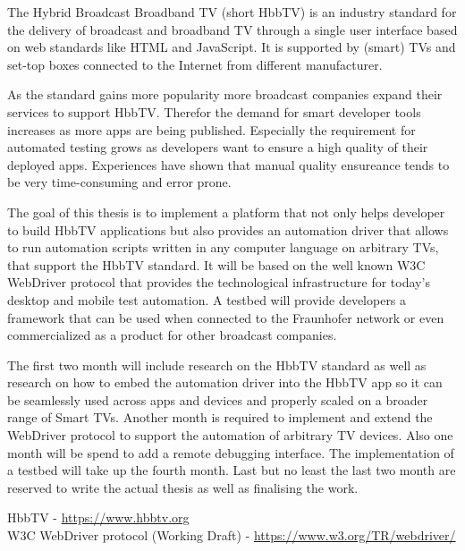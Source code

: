 
The Hybrid Broadcast Broadband TV (short HbbTV) is an industry standard for the delivery of broadcast and broadband TV
through a single user interface based on web standards like HTML and JavaScript. It is supported by (smart) TVs and
set-top boxes connected to the Internet from different manufacturer.


As the standard gains more popularity more broadcast companies expand their services to support HbbTV. Therefor the
demand for smart developer tools increases as more apps are being published. Especially the requirement for
automated testing grows as developers want to ensure a high quality of their deployed apps. Experiences have shown
that manual quality ensureance tends to be very time-consuming and error prone.


The goal of this thesis is to implement a platform that not only helps developer to build HbbTV applications but
also provides an automation driver that allows to run automation scripts written in any computer language on
arbitrary TVs, that support the HbbTV standard. It will be based on the well known W3C WebDriver protocol that
provides the technological infrastructure for today's desktop and mobile test automation. A testbed will provide
developers a framework that can be used when connected to the Fraunhofer network or even commercialized as
a product for other broadcast companies.


The first two month will include research on the HbbTV standard as well as research on how to embed the automation driver
into the HbbTV app so it can be seamlessly used across apps and devices and properly scaled on a broader range of
Smart TVs. Another month is required to implement and extend the WebDriver protocol to support the automation
of arbitrary TV devices. Also one month will be spend to add a remote debugging interface. The implementation of
a testbed will take up the fourth month. Last but no least the last two month are reserved to write the actual
thesis as well as finalising the work.


HbbTV - \url{https://www.hbbtv.org} \\
W3C WebDriver protocol (Working Draft) - \url{https://www.w3.org/TR/webdriver/}
